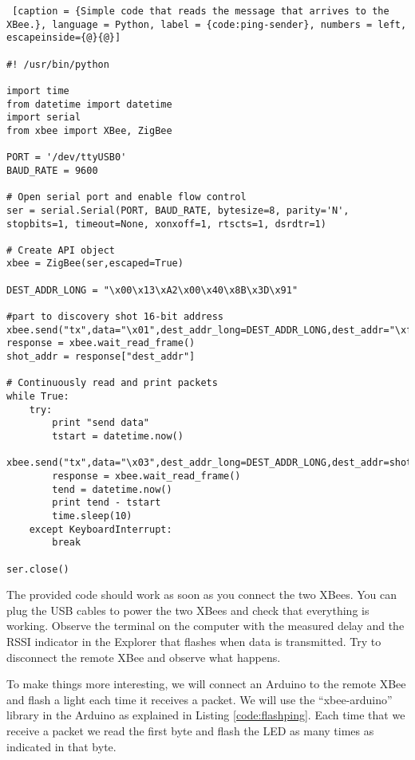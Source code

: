 \begin{lstlisting} [caption = {Simple code that reads the message that arrives to the XBee.}, language = Python, label = {code:ping-sender}, numbers = left, escapeinside={@}{@}]

#! /usr/bin/python

import time
from datetime import datetime
import serial
from xbee import XBee, ZigBee

PORT = '/dev/ttyUSB0'
BAUD_RATE = 9600

# Open serial port and enable flow control
ser = serial.Serial(PORT, BAUD_RATE, bytesize=8, parity='N', stopbits=1, timeout=None, xonxoff=1, rtscts=1, dsrdtr=1)

# Create API object
xbee = ZigBee(ser,escaped=True)

DEST_ADDR_LONG = "\x00\x13\xA2\x00\x40\x8B\x3D\x91"

#part to discovery shot 16-bit address
xbee.send("tx",data="\x01",dest_addr_long=DEST_ADDR_LONG,dest_addr="\xff\xfe")
response = xbee.wait_read_frame()
shot_addr = response["dest_addr"]

# Continuously read and print packets
while True:
    try:
        print "send data"
        tstart = datetime.now()
        xbee.send("tx",data="\x03",dest_addr_long=DEST_ADDR_LONG,dest_addr=shot_addr)
        response = xbee.wait_read_frame()
        tend = datetime.now()
        print tend - tstart
        time.sleep(10)
    except KeyboardInterrupt:
        break

ser.close()

\end{lstlisting}

The provided code should work as soon as you connect the two XBees. 
You can plug the USB cables to power the two XBees and check that everything is working.
Observe the terminal on the computer with the measured delay and the RSSI indicator in the Explorer that flashes when data is transmitted.
Try to disconnect the remote XBee and observe what happens.

To make things more interesting, we will connect an Arduino to the remote XBee and flash a light each time it receives a packet.
We will use the ``xbee-arduino'' library in the Arduino as explained in Listing \ref{code:flashping}.
Each time that we receive a packet we read the first byte and flash the LED as many times as indicated in that byte.

